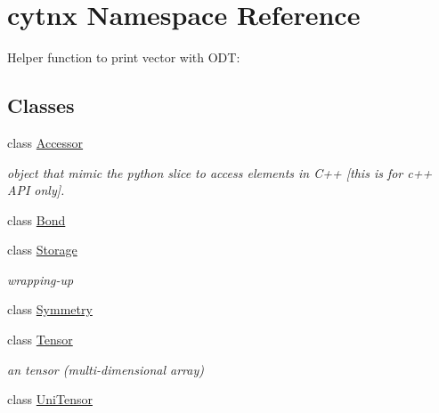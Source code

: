 \hypertarget{namespacecytnx}{}\section{cytnx Namespace Reference}
\label{namespacecytnx}


Helper function to print vector with O\+DT\+:  


\subsection*{Classes}
\begin{DoxyCompactItemize}
\item 
class \hyperlink{classcytnx_1_1Accessor}{Accessor}
\begin{DoxyCompactList}\small\item\em object that mimic the python slice to access elements in C++ \mbox{[}this is for c++ A\+PI only\mbox{]}. \end{DoxyCompactList}\item 
class \hyperlink{classcytnx_1_1Bond}{Bond}
\item 
class \hyperlink{classcytnx_1_1Storage}{Storage}
\begin{DoxyCompactList}\small\item\em wrapping-\/up \end{DoxyCompactList}\item 
class \hyperlink{classcytnx_1_1Symmetry}{Symmetry}
\item 
class \hyperlink{classcytnx_1_1Tensor}{Tensor}
\begin{DoxyCompactList}\small\item\em an tensor (multi-\/dimensional array) \end{DoxyCompactList}\item 
class \hyperlink{classcytnx_1_1UniTensor}{Uni\+Tensor}
\end{DoxyCompactItemize}
